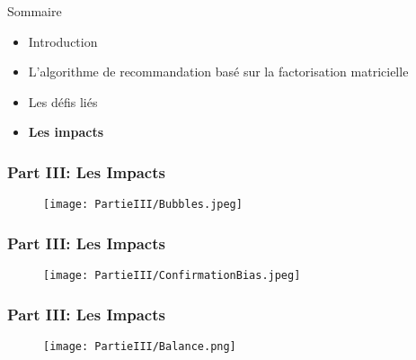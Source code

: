 \newcommand{\PartieIII}{Part III: Les Impacts}

\begin{frame}{Sommaire}
    \begin{itemize}
        \item Introduction
        \item L'algorithme de recommandation basé sur la factorisation matricielle
        \item Les défis liés
        \item \textbf{Les impacts}
    \end{itemize}
\end{frame}


\begin{frame}
    \frametitle{\PartieIII}

    \begin{figure}
        \centering
        \texttt{[image: PartieIII/Bubbles.jpeg]}
    \end{figure}

\end{frame}

\begin{frame}
    \frametitle{\PartieIII}

    \begin{figure}
        \centering
        \texttt{[image: PartieIII/ConfirmationBias.jpeg]}
    \end{figure}

\end{frame}

\begin{frame}
    \frametitle{\PartieIII}

    \begin{figure}
        \centering
        \texttt{[image: PartieIII/Balance.png]}
    \end{figure}

\end{frame}